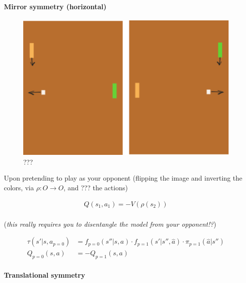\hypertarget{mirror-symmetry-horizontal}{%
\paragraph{Mirror symmetry
(horizontal)}\label{mirror-symmetry-horizontal}}

\begin{figure}
\centering
\includegraphics[width=1\textwidth,height=0.25\textheight]{../../pictures/drawings/pong-horz-flip.png}
\caption{???}
\end{figure}

Upon pretending to play as your opponent (flipping the image and
inverting the colors, via \(\rho: O \to O\), and ??? the actions)

\begin{align}
Q(s_1, a_1) = - V(\rho(s_2)) \\
\end{align}

(\emph{this really requires you to disentangle the model from your
opponent!?})

\begin{align}
\tau(s'|s, a_{p=0}) &= f_{p=0}(s''|s, a) \cdot f_{p=1}(s'|s'', \hat a) \cdot \pi_{p=1}(\hat a|s'') \\
Q_{p=0}(s, a) &= -Q_{p=1}(s, a)
\end{align}

\hypertarget{translational-symmetry-1}{%
\paragraph{Translational symmetry}\label{translational-symmetry-1}}

